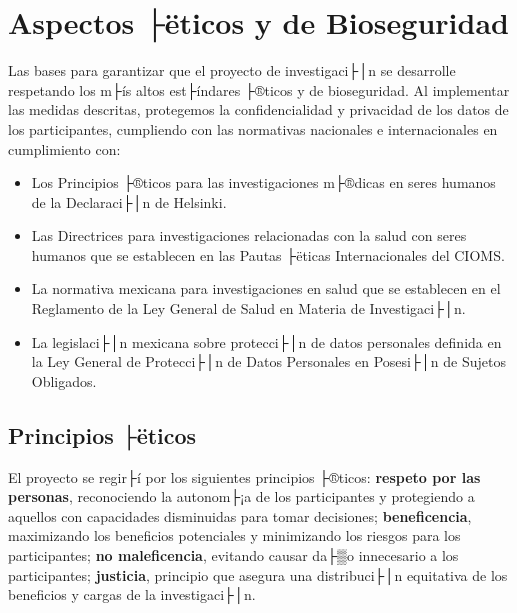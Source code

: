 \section{Aspectos ├ëticos y de Bioseguridad}
\label{sec:aspectos_eticos_bioseguridad}

Las bases para garantizar que el proyecto de investigaci├│n se desarrolle respetando los m├ís altos est├índares ├®ticos y de bioseguridad. Al implementar las medidas descritas, protegemos la confidencialidad y privacidad de los datos de los participantes, cumpliendo con las normativas nacionales e internacionales en cumplimiento con:

\begin{itemize}
    \item Los Principios ├®ticos para las investigaciones m├®dicas en seres humanos de la Declaraci├│n de Helsinki.
    
    \item Las Directrices para investigaciones relacionadas con la salud con seres humanos que se establecen en las Pautas ├ëticas Internacionales del CIOMS.
    
    \item La normativa mexicana para investigaciones en salud que se establecen en el Reglamento de la Ley General de Salud en Materia de Investigaci├│n.
    
    \item La legislaci├│n mexicana sobre protecci├│n de datos personales definida en la Ley General de Protecci├│n de Datos Personales en Posesi├│n de Sujetos Obligados.
\end{itemize}

\subsection{Principios ├ëticos}
\label{subsec:principios_eticos}

El proyecto se regir├í por los siguientes principios ├®ticos: \textbf{respeto por las personas}, reconociendo la autonom├¡a de los participantes y protegiendo a aquellos con capacidades disminuidas para tomar decisiones; \textbf{beneficencia}, maximizando los beneficios potenciales y minimizando los riesgos para los participantes; \textbf{no maleficencia}, evitando causar da├▒o innecesario a los participantes; \textbf{justicia}, principio que asegura una distribuci├│n equitativa de los beneficios y cargas de la investigaci├│n.

